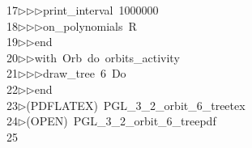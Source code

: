 \begin{tabbing}
17\>$\triangleright$\>$\triangleright$\>$\triangleright$\>print\_interval\ 1000000\ \\[0pt]
18\>$\triangleright$\>$\triangleright$\>$\triangleright$\>on\_polynomials\ R\ \\[0pt]
19\>$\triangleright$\>$\triangleright$\>end\ \\[0pt]
20\>$\triangleright$\>$\triangleright$\>with\ Orb\ do\ orbits\_activity\ \\[0pt]
21\>$\triangleright$\>$\triangleright$\>$\triangleright$\>draw\_tree\ 6\ Do\ \\[0pt]
22\>$\triangleright$\>$\triangleright$\>end\\[0pt]
23\>$\triangleright$\>(PDFLATEX)\ PGL\_3\_2\_orbit\_6\_treetex\\[0pt]
24\>$\triangleright$\>(OPEN)\ PGL\_3\_2\_orbit\_6\_treepdf\\[0pt]
25\>\end{tabbing}
